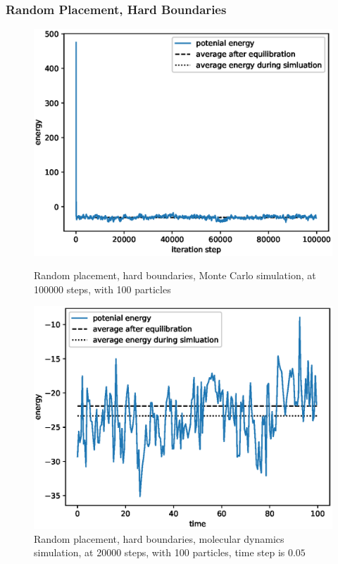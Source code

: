\documentclass[UTF8,a4paper]{article}
\begin{document}
\subsubsection{Random Placement, Hard Boundaries}
\begin{figure}[H]
	\centering
	\begin{minipage}[t]{0.45\textwidth}
		\centering
		\includegraphics[height=0.2\textheight]{fig/exp2_rand_hard_mc.eps}
		\caption{Random placement, hard boundaries, Monte Carlo simulation, at 100000 steps, with 100 particles}
	\end{minipage}\hspace{0.5cm}
	\begin{minipage}[t]{0.45\textwidth}
		\centering
		\includegraphics[height=0.2\textheight]{fig/exp2_rand_hard_md.eps}
		\caption{Random placement, hard boundaries, molecular dynamics simulation, at 20000 steps, with 100 particles, time step is $0.05$}
	\end{minipage}
\end{figure}
\end{document}
